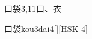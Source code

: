 \begin{entry}{口袋}{3,11}{⼝、⾐}
  \begin{phonetics}{口袋}{kou3dai4}[][HSK 4]
  \end{phonetics}
\end{entry}
